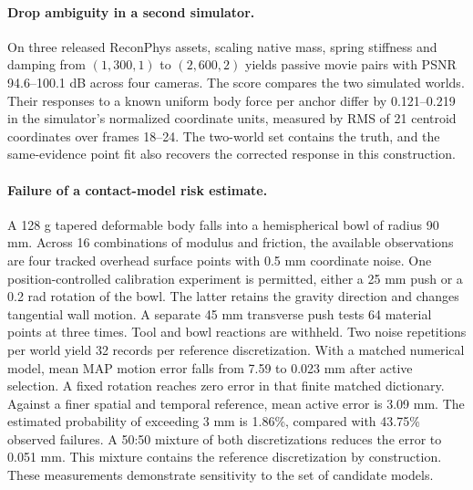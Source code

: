 \paragraph{Drop ambiguity in a second simulator.}
On three released ReconPhys assets, scaling native mass, spring stiffness and damping from $(1,300,1)$ to $(2,600,2)$ yields passive movie pairs with PSNR 94.6--100.1 dB across four cameras. The score compares the two simulated worlds. Their responses to a known uniform body force per anchor differ by 0.121--0.219 in the simulator's normalized coordinate units, measured by RMS of 21 centroid coordinates over frames 18--24. The two-world set contains the truth, and the same-evidence point fit also recovers the corrected response in this construction.

\paragraph{Failure of a contact-model risk estimate.}
A 128 g tapered deformable body falls into a hemispherical bowl of radius 90 mm. Across 16 combinations of modulus and friction, the available observations are four tracked overhead surface points with 0.5 mm coordinate noise. One position-controlled calibration experiment is permitted, either a 25 mm push or a 0.2 rad rotation of the bowl. The latter retains the gravity direction and changes tangential wall motion. A separate 45 mm transverse push tests 64 material points at three times. Tool and bowl reactions are withheld. Two noise repetitions per world yield 32 records per reference discretization. With a matched numerical model, mean MAP motion error falls from 7.59 to 0.023 mm after active selection. A fixed rotation reaches zero error in that finite matched dictionary. Against a finer spatial and temporal reference, mean active error is 3.09 mm. The estimated probability of exceeding 3 mm is 1.86\%, compared with 43.75\% observed failures. A 50:50 mixture of both discretizations reduces the error to 0.051 mm. This mixture contains the reference discretization by construction. These measurements demonstrate sensitivity to the set of candidate models.


